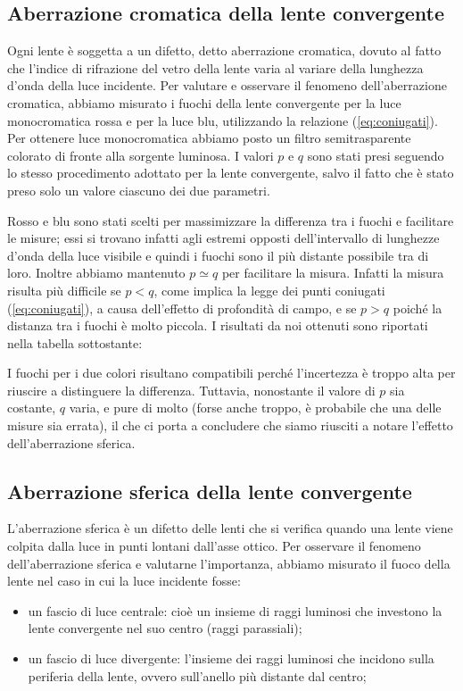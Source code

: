 \subsection{Aberrazione cromatica della lente convergente}

Ogni lente è soggetta a un difetto, detto aberrazione cromatica, dovuto al fatto che l'indice di rifrazione del vetro della lente varia al variare della lunghezza d'onda della luce incidente.
Per valutare e osservare il fenomeno dell'aberrazione cromatica, abbiamo misurato i fuochi della lente convergente per la luce monocromatica rossa e per la luce blu, utilizzando la relazione (\ref{eq:coniugati}).
Per ottenere luce monocromatica abbiamo posto un filtro semitrasparente colorato di fronte alla sorgente luminosa. I valori $p$ e $q$ sono stati presi seguendo lo stesso procedimento adottato per la lente convergente, salvo il fatto che è stato preso solo un valore ciascuno dei due parametri.

Rosso e blu sono stati scelti per massimizzare la differenza tra i fuochi e facilitare le misure; essi si trovano infatti agli estremi opposti dell'intervallo di lunghezze d'onda della luce visibile e quindi i fuochi sono il più distante possibile tra di loro. Inoltre abbiamo mantenuto $p \simeq q$ per facilitare la misura. Infatti la misura risulta più difficile se $p < q$, come implica la legge dei punti coniugati (\ref{eq:coniugati}), a causa dell'effetto di profondità di campo, e se $p > q$ poiché la distanza tra i fuochi è molto piccola.
I risultati da noi ottenuti sono riportati nella tabella sottostante:


I fuochi per i due colori risultano compatibili perché l'incertezza è troppo alta per riuscire a distinguere la differenza. Tuttavia, nonostante il valore di $p$ sia costante, $q$ varia, e pure di molto (forse anche troppo, è probabile che una delle misure sia errata), il che ci porta a concludere che siamo riusciti a notare l'effetto dell'aberrazione sferica.

\subsection{Aberrazione sferica della lente convergente}

L'aberrazione sferica è un difetto delle lenti che si verifica quando una lente viene colpita dalla luce in punti lontani dall'asse ottico.
Per osservare il fenomeno dell'aberrazione sferica e valutarne l'importanza, abbiamo misurato il fuoco della lente nel caso in cui la luce incidente fosse:
\begin{itemize}
    \item{un fascio di luce centrale: cioè un insieme di raggi luminosi che investono la lente convergente nel suo centro (raggi parassiali);}
	\item{un fascio di luce divergente: l'insieme dei raggi luminosi che incidono sulla periferia della lente, ovvero sull'anello più distante dal centro;}
\end{itemize}


